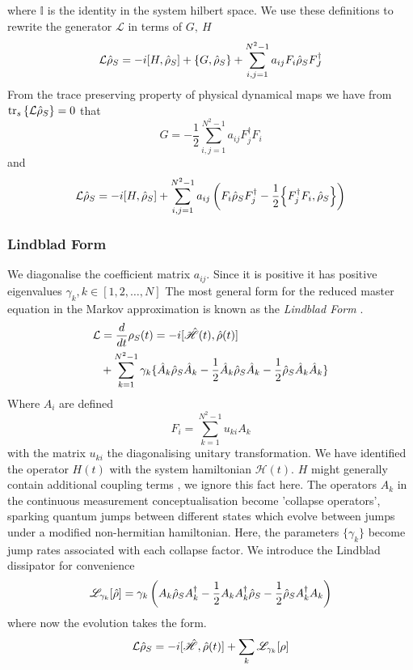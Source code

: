 where $\mathbb{I}$ is the identity in the system hilbert space.
We use these definitions to rewrite the generator $\mathcal{L}$ in terms of $G,\ H$
\begin{equation}
  \mathcal{L} \dens_S = -i \comm{H}{\dens_S} + \acomm{G}{\dens_S} + \sum_{i, j=1}^{N^2-1}a_{ij}F_i\dens_SF_J^\dagger
\end{equation}
From the trace preserving property of physical dynamical maps we have from $\tr_s\left\{\mathcal{L}\hat{\rho}_S \right\} = 0$ that 
\begin{equation}
  G = -\frac{1}{2} \sum_{i, j=1}^{N^2-1} a_{ij} F_j^\dagger F_i
\end{equation}
and 
\begin{equation}
  \mathcal{L} \dens_S = -i \comm{H}{\dens_S} + \sum_{i, j=1}^{N^2-1}a_{ij}\left(F_i\dens_S F_j^\dagger - \frac{1}{2} \acomm{F_j^\dagger F_i}{\dens_S}\right)
\end{equation}

\subsubsection{Lindblad Form}
We diagonalise the coefficient matrix $a_{ij}$. 
Since it is positive it has positive eigenvalues $\gamma_k, k \in [1, 2, \dots, N]$
The most general form \cite[119--122]{Breuer2002} for the reduced master equation in the Markov approximation is known as the \emph{Lindblad Form} \cite{Lindblad1976}.
\begin{align}
  \mathcal{L} &= \frac{d}{dt} \rho_S (t) = -i[\hat{\mathscr{H}} (t), \hat{\rho} (t)\notag]\\
                                 & + \sum_{k=1}^{N^2-1} \gamma_k \{ \hat{A}_k \hat{\rho}_S \hat{A}_k -\frac{1}{2}  \hat{A}_k \hat{\rho}_S \hat{A}_k -\frac{1}{2} \hat{\rho}_S \hat{A}_k \hat{A}_k \}
\end{align}
Where $A_i$ are defined
\begin{equation}
  F_i = \sum_{k=1}^{N^2-1}u_{ki}A_k
\end{equation}
with the matrix $u_{ki}$ the diagonalising unitary transformation.
We have identified the operator $H(t)$ with the system hamiltonian $\mathscr{H}(t)$.
$H$ might generally contain additional coupling terms \cite{Breuer2002}, we ignore this fact here.
The operators $A_k$ in the continuous measurement conceptualisation \cite{Carmichael1993} become 'collapse operators', sparking quantum jumps between different states which evolve between jumps under a modified non-hermitian hamiltonian.
Here, the parameters $\{\gamma_k\}$ become jump rates associated with each collapse factor.
We introduce the Lindblad dissipator for convenience
\begin{equation}
  \mathscr{L}_{\gamma_k}[\hat{\rho}] = \gamma_k \left( A_k \hat{\rho}_S A_k^\dagger - \frac{1}{2} A_k A_k^\dagger \hat{\rho}_S - \frac{1}{2} \hat{\rho}_S A_k^\dagger A_k \right)
\end{equation}
where now the evolution takes the form.
\begin{equation}
  \mathcal{L} \hat{\rho}_S = -i[\hat{\mathscr{H}}, \hat{\rho}(t)]+ \sum_k \mathscr{L}_{\gamma_{k}} [\rho]
\end{equation}
